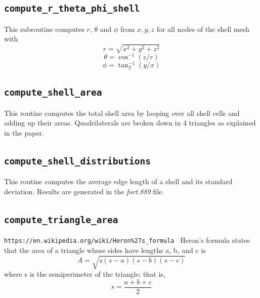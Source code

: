  \subsection{\tt compute\_r\_theta\_phi\_shell}
 This subroutine computes $r$, $\theta$ and $\phi$ from $x,y,z$ for all 
 nodes of the shell mesh with
 \[
 r=\sqrt{x^2+y^2+z^2}
 \]
 \[
 \theta=\cos^{-1}(z/r)
 \]
 \[
 \phi=\tan^{-1}_2 (y/x)
 \]
 \subsection{\tt compute\_shell\_area}
 This routine computes the total shell area by looping over all shell cells and 
 adding up their areas. Quadrilaterals are broken down in 4 triangles as explained in the paper. 
 \subsection{\tt compute\_shell\_distributions}
 This routine computes the average edge length of a shell and its standard deviation.
 Results are generated in the {\sl fort.889} file.
 \subsection{\tt compute\_triangle\_area}
 {\tt https://en.wikipedia.org/wiki/Heron\%27s\_formula }
 Heron's formula states that the area of a triangle whose sides have lengths a, b, and c is
 \[
 A=\sqrt{s(s-a)(s-b)(s-c)}
 \]
 where s is the semiperimeter of the triangle; that is,
 \[
 s=\frac{a+b+c}{2}
 \]
